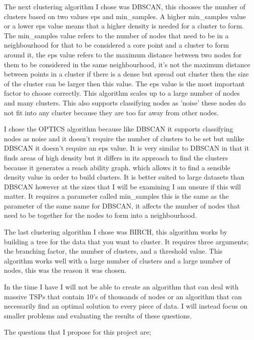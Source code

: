 The next clustering algorithm I chose was DBSCAN, this chooses the number of clusters based on two values eps and min\_samples. A higher min\_samples value or a lower eps value means that a higher density is needed for a cluster to form. The min\_samples value refers to the number of nodes that need to be in a neighbourhood for that to be considered a core point and a cluster to form around it, the eps value refers to the maximum distance between two nodes for them to be considered in the same neighbourhood, it's not the maximum distance between points in a cluster if there is a dense but spread out cluster then the size of the cluster can be larger then this value. The eps value is the most important factor to choose correctly. This algorithm scales up to a large number of nodes and many clusters. This also supports classifying nodes as 'noise' these nodes do not fit into any cluster because they are too far away from other nodes.

I chose the OPTICS algorithm because like DBSCAN it supports classifying nodes as noise and it doesn't require the number of clusters to be set but unlike DBSCAN it doesn't require an eps value. It is very similar to DBSCAN in that it finds areas of high density but it differs in its approach to find the clusters because it generates a reach ability graph. which allows it to find a sensible density value in order to build clusters. It is better suited to large datasets than DBSCAN however at the sizes that I will be examining I am unsure if this will matter. It requires a parameter called min\_samples this is the same as the parameter of the same name for DBSCAN, it affects the number of nodes that need to be together for the nodes to form into a neighbourhood.

The last clustering algorithm I chose was BIRCH, this algorithm works by building a tree for the data that you want to cluster. It requires three arguments; the branching factor, the number of clusters, and a threshold value. This algorithm works well with a large number of clusters and a large number of nodes, this was the reason it was chosen.

In the time I have I will not be able to create an algorithm that can deal with massive TSPs that contain 10's of thousands of nodes or an algorithm that can necessarily find an optimal solution to every piece of data. I will instead focus on smaller problems and evaluating the results of these questions.

The questions that I propose for this project are;

